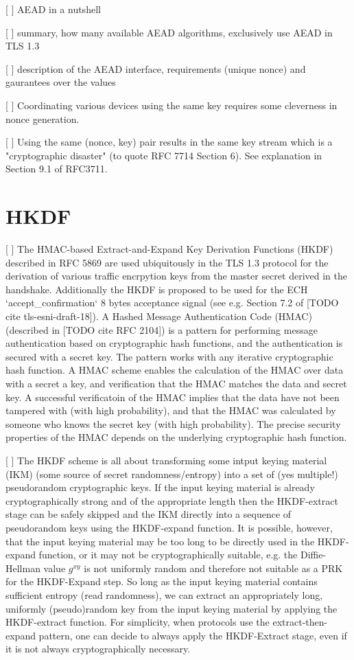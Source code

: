 [ ] AEAD in a nutshell

[ ] summary, how many available AEAD algorithms, exclusively use AEAD in TLS 1.3

[ ] description of the AEAD interface, requirements (unique nonce) and gaurantees over the values

[ ] Coordinating various devices using the same key requires some cleverness in nonce generation.

[ ] Using the same (nonce, key) pair results in the same key stream which is a "cryptographic disaster" (to quote RFC 7714 Section 6). See explanation in Section 9.1 of RFC3711.

\section{HKDF}

[ ] The HMAC-based Extract-and-Expand Key Derivation Functions (HKDF) described in RFC 5869 are used ubiquitously in the TLS 1.3 protocol for the derivation of various traffic encrpytion keys from the master secret derived in the handshake. Additionally the HKDF is proposed to be used for the ECH `accept_confirmation` 8 bytes acceptance signal (see e.g. Section 7.2 of [TODO cite tls-esni-draft-18]). A Hashed Message Authentication Code (HMAC) (described in [TODO cite RFC 2104]) is a pattern for performing message authentication based on cryptographic hash functions, and the authentication is secured with a secret key. The pattern works with any iterative cryptographic hash function. A HMAC scheme enables the calculation of the HMAC over data with a secret a key, and verification that the HMAC matches the data and secret key. A successful verificatoin of the HMAC implies that the data have not been tampered with (with high probability), and that the HMAC was calculated by someone who knows the secret key (with high probability). The precise security properties of the HMAC depends on the underlying cryptographic hash function.

[ ] The HKDF scheme is all about transforming some intput keying material (IKM) (some source of secret randomness/entropy) into a set of (yes multiple!) pseudorandom cryptographic keys. If the input keying material is already cryptographically strong and of the appropriate length then the HKDF-extract stage can be safely skipped and the IKM directly into a sequence of pseudorandom keys using the HKDF-expand function. It is possible, however, that the input keying material may be too long to be directly used in the HKDF-expand function, or it may not be cryptographically suitable, e.g. the Diffie-Hellman value $g^{xy}$ is not uniformly random and therefore not suitable as a PRK for the HKDF-Expand step. So long as the input keying material contains sufficient entropy (read randomness), we can extract an appropriately long, uniformly (pseudo)random key from the input keying material by applying the HKDF-extract function. For simplicity, when protocols use the extract-then-expand pattern, one can decide to always apply the HKDF-Extract stage, even if it is not always cryptographically necessary.

